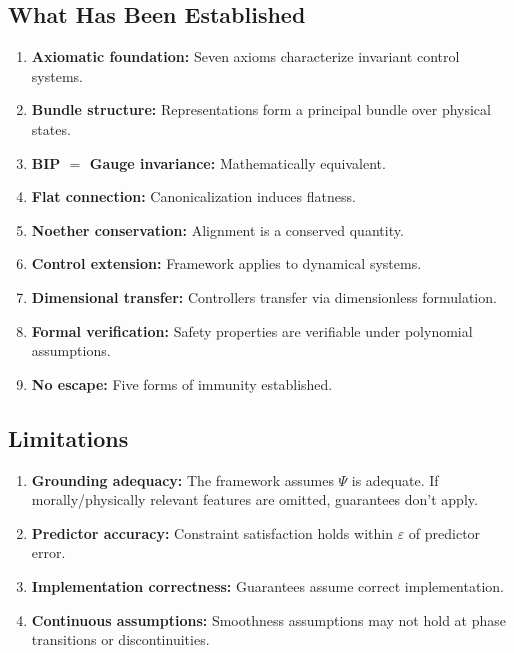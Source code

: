 \documentclass[11pt]{article}
\begin{document}
\subsection{What Has Been Established}

\begin{enumerate}
    \item \textbf{Axiomatic foundation:} Seven axioms characterize invariant control systems.
    \item \textbf{Bundle structure:} Representations form a principal bundle over physical states.
    \item \textbf{BIP $=$ Gauge invariance:} Mathematically equivalent.
    \item \textbf{Flat connection:} Canonicalization induces flatness.
    \item \textbf{Noether conservation:} Alignment is a conserved quantity.
    \item \textbf{Control extension:} Framework applies to dynamical systems.
    \item \textbf{Dimensional transfer:} Controllers transfer via dimensionless formulation.
    \item \textbf{Formal verification:} Safety properties are verifiable under polynomial assumptions.
    \item \textbf{No escape:} Five forms of immunity established.
\end{enumerate}

\subsection{Limitations}

\begin{enumerate}
    \item \textbf{Grounding adequacy:} The framework assumes $\Psi$ is adequate. If morally/physically
    relevant features are omitted, guarantees don't apply.

    \item \textbf{Predictor accuracy:} Constraint satisfaction holds within $\varepsilon$ of predictor error.

    \item \textbf{Implementation correctness:} Guarantees assume correct implementation.

    \item \textbf{Continuous assumptions:} Smoothness assumptions may not hold at phase transitions
    or discontinuities.
\end{enumerate}
\end{document}
